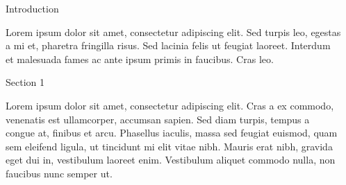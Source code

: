\documentclass[final]{beamer}
\newlength{\sepwid}
\newlength{\onecolwid}
\begin{document}
\begin{frame}[t]
\begin{columns}[t]

\begin{column}{\sepwid}\end{column} %

\begin{column}{\onecolwid} %



\begin{block}{Introduction}

Lorem ipsum dolor sit amet, consectetur adipiscing elit. Sed turpis leo, egestas a mi et, pharetra fringilla risus. Sed lacinia felis ut feugiat laoreet. Interdum et malesuada fames ac ante ipsum primis in faucibus. Cras leo.

\end{block}
\vspace{-0.3in}


\begin{block}{Section 1}

Lorem ipsum dolor sit amet, consectetur adipiscing elit. Cras a ex commodo, venenatis est ullamcorper, accumsan sapien. Sed diam turpis, tempus a congue at, finibus et arcu. Phasellus iaculis, massa sed feugiat euismod, quam sem eleifend ligula, ut tincidunt mi elit vitae nibh. Mauris erat nibh, gravida eget dui in, vestibulum laoreet enim. Vestibulum aliquet commodo nulla, non faucibus nunc semper ut.


\end{block}
\end{column}
\end{columns}
\end{frame}
\end{document}
